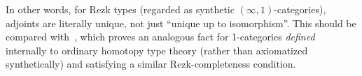 \documentclass{amsart}
\theoremstyle{plain}
\theoremstyle{definition}
\newtheorem{defn}[thm]{Definition}
\theoremstyle{remark}
\numberwithin{equation}{section}
\newcommand{\extfn}[1]{{#1}_\#}
\newcommand{\defeq}{\coloneqq}
\newcommand{\univtype}{\mathcal{U}}
\newcommand{\two}{\mathbb{2}}
\newcommand{\comma}{\!\downarrow\!}
\newcommand{\Parens}[1]{\Bigl(#1\Bigr)}
\begin{document}
In other words, for Rezk types (regarded as synthetic $(\infty,1)$-categories), adjoints are literally unique, not just ``unique up to isomorphism''.
This should be compared with~\cite[Lemma 9.3.2]{hottbook}, which proves an analogous fact for 1-categories \emph{defined} internally to ordinary homotopy type theory (rather than axiomatized synthetically) and satisfying a similar Rezk-completeness condition.






\end{document}
